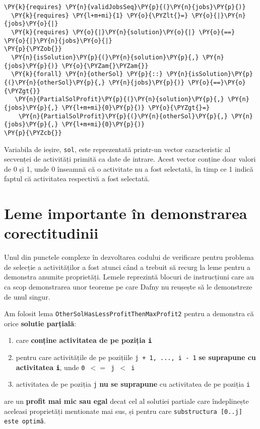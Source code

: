 \begin{itemize}
\begin{footnotesize}
\begin{Verbatim}[commandchars=\\\{\}, fontsize=\footnotesize]
  \PY{k}{requires} \PY{n}{validJobsSeq}\PY{p}{(}\PY{n}{jobs}\PY{p}{)}
  \PY{k}{requires} \PY{l+m+mi}{1} \PY{o}{\PYZlt{}=} \PY{o}{|}\PY{n}{jobs}\PY{o}{|}
  \PY{k}{requires} \PY{o}{|}\PY{n}{solution}\PY{o}{|} \PY{o}{==} \PY{o}{|}\PY{n}{jobs}\PY{o}{|}
\PY{p}{\PYZob{}}
  \PY{n}{isSolution}\PY{p}{(}\PY{n}{solution}\PY{p}{,} \PY{n}{jobs}\PY{p}{)} \PY{o}{\PYZam{}\PYZam{}}
  \PY{k}{forall} \PY{n}{otherSol} \PY{p}{::} \PY{n}{isSolution}\PY{p}{(}\PY{n}{otherSol}\PY{p}{,} \PY{n}{jobs}\PY{p}{)} \PY{o}{==}\PY{o}{\PYZgt{}} 
   \PY{n}{PartialSolProfit}\PY{p}{(}\PY{n}{solution}\PY{p}{,} \PY{n}{jobs}\PY{p}{,} \PY{l+m+mi}{0}\PY{p}{)} \PY{o}{\PYZgt{}=} 
    \PY{n}{PartialSolProfit}\PY{p}{(}\PY{n}{otherSol}\PY{p}{,} \PY{n}{jobs}\PY{p}{,} \PY{l+m+mi}{0}\PY{p}{)}
\PY{p}{\PYZcb{}}
\end{Verbatim}
\end{footnotesize}
\end{itemize} 


Variabila de ieșire, \texttt{sol}, este reprezentată printr-un vector caracteristic al secvenței de activități primită ca date de intrare. Acest vector conține doar valori de 0 și 1, unde 0 înseamnă că o activitate nu a fost selectată, în timp ce 1 indică faptul că activitatea respectivă a fost selectată.

\section{Leme importante în demonstrarea corectitudinii}
Unul din punctele complexe în dezvoltarea codului de verificare pentru problema de selecție a activităților a fost atunci când a trebuit să recurg la leme pentru a demonstra anumite proprietăți. Lemele reprezintă blocuri de instrucțiuni care au ca scop demonstrarea unor teoreme pe care Dafny nu reușește să le demonstreze de unul singur.

Am folosit lema \texttt{OtherSolHasLessProfitThenMaxProfit2} pentru a demonstra că orice \textbf{solutie parțială}:
\begin{enumerate}
    \item care \textbf{conține activitatea de pe poziția \texttt{i}}
    \item pentru care activitățile de pe pozițiile \texttt{j + 1, ..., i - 1} \textbf{se suprapune cu activitatea \texttt{i}}, unde \texttt{0 $<=$ j $<$ i}
    \item activitatea de pe poziția \texttt{j} \textbf{nu se suprapune} cu activitatea de pe poziția \texttt{i} 
\end{enumerate}
are un \textbf{profit mai mic sau egal} decat cel al solutiei partiale care îndeplinește aceleasi proprietăți mentionate mai sus, și pentru care \texttt{substructura [0..j] este optimă}. 

